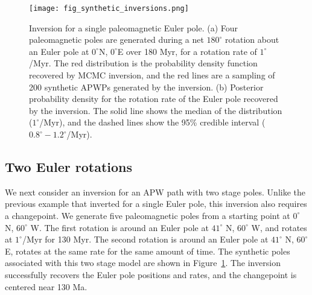 \documentclass[11pt,letterpaper]{article}
\begin{document}
\begin{figure}
\texttt{[image: fig\_synthetic\_inversions.png]}
\caption{Inversion for a single paleomagnetic Euler pole. (a) Four paleomagnetic poles are generated during a net $180^\circ$ rotation about an Euler pole at $0^\circ$N, $0^\circ$E over 180 Myr, for a rotation rate of $1^\circ$/Myr. The red distribution is the probability density function recovered by MCMC inversion, and the red lines are a sampling of 200 synthetic APWPs generated by the inversion. (b) Posterior probability density for the rotation rate of the Euler pole recovered by the inversion. The solid line shows the median of the distribution ($1^\circ$/Myr), and the dashed lines show the 95\% credible interval ($0.8^\circ-1.2^\circ$/Myr). }
\label{fig:synthetic_pep}
\end{figure}


\subsection*{Two Euler rotations}
\label{sec:two_stage_poles}
We next consider an inversion for an APW path with two stage poles. Unlike the previous example that inverted for a single Euler pole, this inversion also requires a changepoint. We generate five paleomagnetic poles from a starting point at $0^\circ$ N, $60^\circ$ W. The first rotation is around an Euler pole at $41^\circ$ N, $60^\circ$ W, and rotates at $1^\circ$/Myr for 130 Myr. The second rotation is around an Euler pole at $41^\circ$ N, $60^\circ$ E, rotates at the same rate for the same amount of time. The synthetic poles associated with this two stage model are shown in Figure~\ref{fig:synthetic_pep}. The inversion successfully recovers the Euler pole positions and rates, and the changepoint is centered near 130 Ma.
\end{document}
